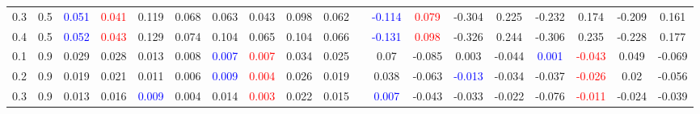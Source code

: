 \documentclass[specialist,
substylefile = spbu_report.rtx,
subf,href,colorlinks=true, 12pt]{disser}
\theoremstyle{definition}
\begin{document}
\begin{table}
{\begin{tabular}{m{1cm}m{1cm}ccccccccm{0.2cm}cccccccc}
			0.3 & 0.5    & \textcolor{blue}{0.051}                 & \textcolor{red}{0.041}                     & 0.119                               & 0.068                       & 0.063                   & 0.043                                   & 0.098                                      & 0.062                    &                             & \textcolor{blue}{-0.114} & \textcolor{red}{0.079} & -0.304                   & 0.225      & -0.232                   & 0.174                   & -0.209                   & 0.161                  \\
			0.4 & 0.5    & \textcolor{blue}{0.052}                 & \textcolor{red}{0.043}                     & 0.129                               & 0.074                       & 0.104                   & 0.065                                   & 0.104                                      & 0.066                    &                             & \textcolor{blue}{-0.131} & \textcolor{red}{0.098} & -0.326                   & 0.244      & -0.306                   & 0.235                   & -0.228                   & 0.177                  \\
			\hline
			0.1 & 0.9    & 0.029                                   & 0.028                                      & 0.013                               & 0.008                       & \textcolor{blue}{0.007} & \textcolor{red}{0.007}                  & 0.034                                      & 0.025                    &                             & 0.07                     & -0.085                 & 0.003                    & -0.044     & \textcolor{blue}{0.001}  & \textcolor{red}{-0.043} & 0.049                    & -0.069                 \\
			0.2 & 0.9    & 0.019                                   & 0.021                                      & 0.011                               & 0.006                       & \textcolor{blue}{0.009} & \textcolor{red}{0.004}                  & 0.026                                      & 0.019                    &                             & 0.038                    & -0.063                 & \textcolor{blue}{-0.013} & -0.034     & -0.037                   & \textcolor{red}{-0.026} & 0.02                     & -0.056                 \\
			0.3 & 0.9    & 0.013                                   & 0.016                                      & \textcolor{blue}{0.009}             & 0.004                       & 0.014                   & \textcolor{red}{0.003}                  & 0.022                                      & 0.015                    &                             & \textcolor{blue}{0.007}  & -0.043                 & -0.033                   & -0.022     & -0.076                   & \textcolor{red}{-0.011} & -0.024                   & -0.039                 \\

\end{tabular}}
\end{table}
\end{document}
